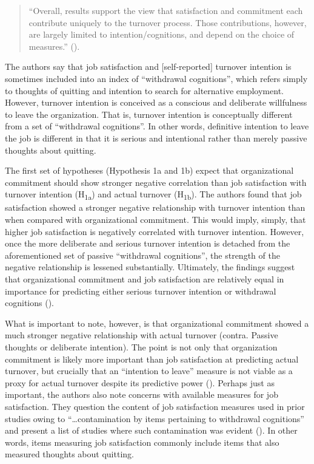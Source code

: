 \documentclass[
  11pt,
  a4paper,
]{article}
\begin{document}
\begin{quote}
``Overall, results support the view that satisfaction and commitment
each contribute uniquely to the turnover process. Those contributions,
however, are largely limited to intention/cognitions, and depend on the
choice of measures.'' ().
\end{quote}

The authors say that job satisfaction and {[}self-reported{]} turnover
intention is sometimes included into an index of ``withdrawal
cognitions'', which refers simply to thoughts of quitting and intention
to search for alternative employment. However, turnover intention is
conceived as a conscious and deliberate willfulness to leave the
organization. That is, turnover intention is conceptually different from
a set of ``withdrawal cognitions''. In other words, definitive intention
to leave the job is different in that it is serious and intentional
rather than merely passive thoughts about quitting.

The first set of hypotheses (Hypothesis 1a and 1b) expect that
organizational commitment should show stronger negative correlation than
job satisfaction with turnover intention (H\textsubscript{1a}) and
actual turnover (H\textsubscript{1b}). The authors found that job
satisfaction showed a stronger negative relationship with turnover
intention than when compared with organizational commitment. This would
imply, simply, that higher job satisfaction is negatively correlated
with turnover intention. However, once the more deliberate and serious
turnover intention is detached from the aforementioned set of passive
``withdrawal cognitions'', the strength of the negative relationship is
lessened substantially. Ultimately, the findings suggest that
organizational commitment and job satisfaction are relatively equal in
importance for predicting either serious turnover intention or
withdrawal cognitions ().

What is important to note, however, is that organizational commitment
showed a much stronger negative relationship with actual turnover
(contra. Passive thoughts or deliberate intention). The point is not
only that organization commitment is likely more important than job
satisfaction at predicting actual turnover, but crucially that an
``intention to leave'' measure is not viable as a proxy for actual
turnover despite its predictive power (). Perhaps just as important, the authors also note concerns
with available measures for job satisfaction. They question the content
of job satisfaction measures used in prior studies owing to
``\ldots contamination by items pertaining to withdrawal cognitions''
and present a list of studies where such contamination was evident
(). In other words,
items measuring job satisfaction commonly include items that also
measured thoughts about quitting.
\end{document}
